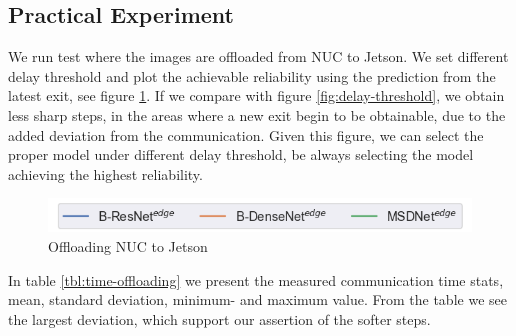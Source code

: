 \subsection{Practical Experiment}

We run test where the images are offloaded from NUC to Jetson. We set different delay threshold and plot the achievable reliability using the prediction from the latest exit, see figure \ref{fig:practical-offloading}. If we compare with figure \ref{fig:delay-threshold}, we obtain less sharp steps, in the areas where a new exit begin to be obtainable, due to the added deviation from the communication. Given this figure, we can select the proper model under different delay threshold, be always selecting the model achieving the highest reliability.  

\begin{figure}
	\captionsetup[subfigure]{justification=centering,farskip=1pt,captionskip=1pt}
	\centering
	\includegraphics[width=.7\linewidth]{figures/edge/offloading_legend}
	\hfill
	\caption[Offloading NUC to Jetson]{Offloading NUC to Jetson}
	\label{fig:practical-offloading}
\end{figure}

In table \ref{tbl:time-offloading} we present the measured communication time stats, mean, standard deviation, minimum- and maximum value. From the table we see the largest deviation, which support our assertion of the softer steps. 

